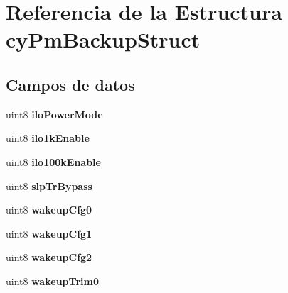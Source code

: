 \hypertarget{structcy_pm_backup_struct}{}\section{Referencia de la Estructura cy\+Pm\+Backup\+Struct}
\label{structcy_pm_backup_struct}
\subsection*{Campos de datos}
\begin{DoxyCompactItemize}
\item 
\mbox{\label{structcy_pm_backup_struct_a9a805f7b6715dbe8221571ddf4fd59c8}} 
uint8 {\bfseries ilo\+Power\+Mode}
\item 
\mbox{\label{structcy_pm_backup_struct_a31e595e8a519a39e72ae7e00c7505090}} 
uint8 {\bfseries ilo1k\+Enable}
\item 
\mbox{\label{structcy_pm_backup_struct_a6d70686f3d34ca61b94650921c6f712a}} 
uint8 {\bfseries ilo100k\+Enable}
\item 
\mbox{\label{structcy_pm_backup_struct_a48abc7cddf9754c9b39984b31e13d9ff}} 
uint8 {\bfseries slp\+Tr\+Bypass}
\item 
\mbox{\label{structcy_pm_backup_struct_afd1d85610438be2187c5bad7f6fed889}} 
uint8 {\bfseries wakeup\+Cfg0}
\item 
\mbox{\label{structcy_pm_backup_struct_a98bb83135934b3f3833bcdc861c0e249}} 
uint8 {\bfseries wakeup\+Cfg1}
\item 
\mbox{\label{structcy_pm_backup_struct_a3bc90d9ef3a64a90eefbf6c7def5d0b9}} 
uint8 {\bfseries wakeup\+Cfg2}
\item 
\mbox{\label{structcy_pm_backup_struct_a381f3b23a8424b24d7f1af5080f431d0}} 
uint8 {\bfseries wakeup\+Trim0}
\item 
\mbox{\label{structcy_pm_backup_struct_add19a608fdac67ccfc3a30f86a5b9494}} 

\end{DoxyCompactItemize}
